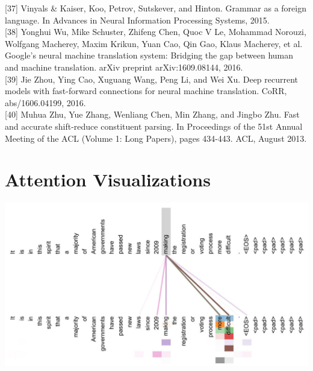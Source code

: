 \documentclass[10pt]{article}
\begin{document}
[37] Vinyals \& Kaiser, Koo, Petrov, Sutskever, and Hinton. Grammar as a foreign language. In Advances in Neural Information Processing Systems, 2015.\\[0pt]
[38] Yonghui Wu, Mike Schuster, Zhifeng Chen, Quoc V Le, Mohammad Norouzi, Wolfgang Macherey, Maxim Krikun, Yuan Cao, Qin Gao, Klaus Macherey, et al. Google's neural machine translation system: Bridging the gap between human and machine translation. arXiv preprint arXiv:1609.08144, 2016.\\[0pt]
[39] Jie Zhou, Ying Cao, Xuguang Wang, Peng Li, and Wei Xu. Deep recurrent models with fast-forward connections for neural machine translation. CoRR, abs/1606.04199, 2016.\\[0pt]
[40] Muhua Zhu, Yue Zhang, Wenliang Chen, Min Zhang, and Jingbo Zhu. Fast and accurate shift-reduce constituent parsing. In Proceedings of the 51st Annual Meeting of the ACL (Volume 1: Long Papers), pages 434-443. ACL, August 2013.

\section*{Attention Visualizations}
\begin{center}
\includegraphics[max width=\textwidth]{2024_11_26_e9e27627ef2b75478aaag-13}
\end{center}
\end{document}

